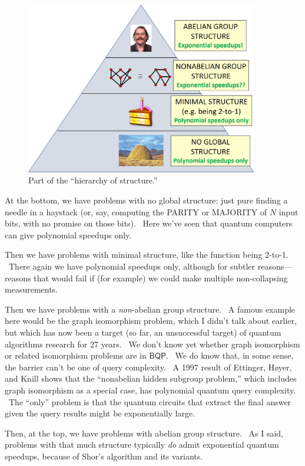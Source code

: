 \documentclass[11pt]{article}
\begin{document}
\begin{figure}
\centering
\includegraphics[width=4in]{hierarchy.jpg}
\caption{Part of the ``hierarchy of structure.''}
\label{hierarchy}
\end{figure}

At the bottom, we have problems with no global structure: just pure finding a needle in a haystack (or, say, computing the PARITY or MAJORITY of $N$ input bits, with no promise on those bits). \ Here we've seen that quantum computers can give polynomial speedups only.

Then we have problems with minimal structure, like the function being 2-to-1. \ There again we have polynomial speedups only, although for subtler reasons---reasons that would fail if (for example) we could make multiple non-collapsing measurements.

Then we have problems with a \emph{non}-abelian group structure. \ A famous example here would be the graph isomorphism problem, which I didn't talk about earlier, but which has now been a target (so far, an unsuccessful target) of quantum algorithms research for 27 years. \ We don't know yet whether graph isomorphism or related isomorphism problems are in $\mathsf{BQP}$. \ We do know that, in some sense, the barrier can't be one of query complexity. \ A 1997 result of Ettinger, H{\o}yer, and Knill \cite{ehk} shows that the ``nonabelian hidden subgroup problem,'' which includes graph isomorphism as a special case, has polynomial quantum query complexity. \ The ``only'' problem is that the quantum circuits that extract the final answer given the query results might be exponentially large.

Then, at the top, we have problems with abelian group structure. \ As I said, problems with that much structure typically \emph{do} admit exponential quantum speedups, because of Shor's algorithm and its variants.
\end{document}
